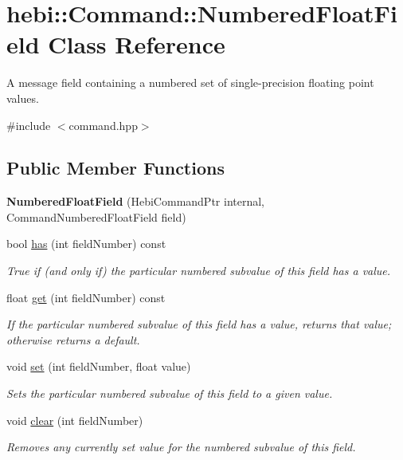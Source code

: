 \hypertarget{classhebi_1_1Command_1_1NumberedFloatField}{}\section{hebi\+:\+:Command\+:\+:Numbered\+Float\+Field Class Reference}
\label{classhebi_1_1Command_1_1NumberedFloatField}


A message field containing a numbered set of single-\/precision floating point values.  




{\ttfamily \#include $<$command.\+hpp$>$}

\subsection*{Public Member Functions}
\begin{DoxyCompactItemize}
\item 
{\bfseries Numbered\+Float\+Field} (Hebi\+Command\+Ptr internal, Command\+Numbered\+Float\+Field field)\hypertarget{classhebi_1_1Command_1_1NumberedFloatField_ae3c9e12a1fd0dfebe8574f5a25c1ddfc}{}\label{classhebi_1_1Command_1_1NumberedFloatField_ae3c9e12a1fd0dfebe8574f5a25c1ddfc}

\item 
bool \hyperlink{classhebi_1_1Command_1_1NumberedFloatField_a6404aedcca18322fa539f240112f1b92}{has} (int field\+Number) const 
\begin{DoxyCompactList}\small\item\em True if (and only if) the particular numbered subvalue of this field has a value. \end{DoxyCompactList}\item 
float \hyperlink{classhebi_1_1Command_1_1NumberedFloatField_a4373e742ee75816e41d8d3335f29f5a1}{get} (int field\+Number) const 
\begin{DoxyCompactList}\small\item\em If the particular numbered subvalue of this field has a value, returns that value; otherwise returns a default. \end{DoxyCompactList}\item 
void \hyperlink{classhebi_1_1Command_1_1NumberedFloatField_ad6ad3a44506da1ae4c274d44184c0123}{set} (int field\+Number, float value)
\begin{DoxyCompactList}\small\item\em Sets the particular numbered subvalue of this field to a given value. \end{DoxyCompactList}\item 
void \hyperlink{classhebi_1_1Command_1_1NumberedFloatField_af70c3b41077806589227f0475b06f12f}{clear} (int field\+Number)
\begin{DoxyCompactList}\small\item\em Removes any currently set value for the numbered subvalue of this field. \end{DoxyCompactList}\end{DoxyCompactItemize}


